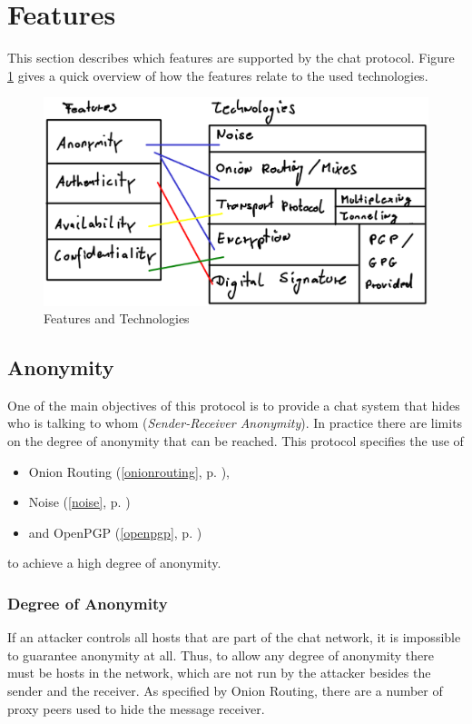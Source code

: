 \section{Features}
\label{protofeatures}
This section describes which features are supported by the chat protocol.
Figure \ref{features-technologies} gives a quick overview of how the
features relate to the used technologies.
\begin{figure}
    \centering
    \caption{Features and Technologies}
    \label{features-technologies}
    \includegraphics[scale=0.8]{features-technologies.eps}
\end{figure}
\subsection{Anonymity}
\label{featanonymity}
One of the main objectives of this protocol is to provide a chat system that
hides who is talking to whom (\textit{Sender-Receiver Anonymity}). 
In practice there are limits on the degree of anonymity that can be reached.
This protocol specifies the use of
\begin{itemize}
\item Onion Routing (\ref{onionrouting}, p. \pageref{onionrouting}),
\item Noise (\ref{noise}, p. \pageref{noise})
\item and OpenPGP (\ref{openpgp}, p. \pageref{openpgp})
\end{itemize}
to achieve a high degree of anonymity.
\subsubsection{Degree of Anonymity}
\label{degreeofanonymity}
If an attacker controls all hosts that are part of the chat network, 
it is impossible to guarantee anonymity at all.
Thus, to allow any degree of anonymity there must be hosts in the network,
which are not run by the attacker besides the sender and the receiver.
As specified by Onion Routing, there are a number of proxy peers used
to hide the message receiver.


